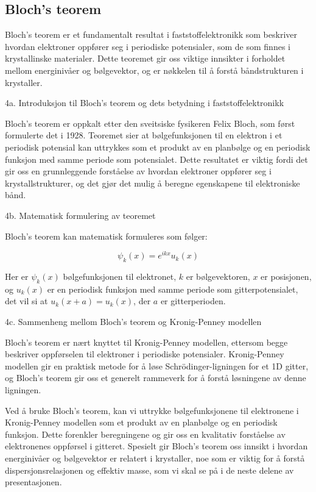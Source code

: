 \subsection*{Bloch's teorem}

Bloch's teorem er et fundamentalt resultat i faststoffelektronikk som beskriver hvordan elektroner oppfører seg i periodiske potensialer, som de som finnes i krystallinske materialer. Dette teoremet gir oss viktige innsikter i forholdet mellom energinivåer og bølgevektor, og er nøkkelen til å forstå båndstrukturen i krystaller.

4a. Introduksjon til Bloch's teorem og dets betydning i faststoffelektronikk

Bloch's teorem er oppkalt etter den sveitsiske fysikeren Felix Bloch, som først formulerte det i 1928. Teoremet sier at bølgefunksjonen til en elektron i et periodisk potensial kan uttrykkes som et produkt av en planbølge og en periodisk funksjon med samme periode som potensialet. Dette resultatet er viktig fordi det gir oss en grunnleggende forståelse av hvordan elektroner oppfører seg i krystallstrukturer, og det gjør det mulig å beregne egenskapene til elektroniske bånd.

4b. Matematisk formulering av teoremet

Bloch's teorem kan matematisk formuleres som følger:

\begin{equation*}
\psi_k(x) = e^{ikx}u_k(x)
\end{equation*}

Her er $\psi_k(x)$ bølgefunksjonen til elektronet, $k$ er bølgevektoren, $x$ er posisjonen, og $u_k(x)$ er en periodisk funksjon med samme periode som gitterpotensialet, det vil si at $u_k(x+a) = u_k(x)$, der $a$ er gitterperioden.

4c. Sammenheng mellom Bloch's teorem og Kronig-Penney modellen

Bloch's teorem er nært knyttet til Kronig-Penney modellen, ettersom begge beskriver oppførselen til elektroner i periodiske potensialer. Kronig-Penney modellen gir en praktisk metode for å løse Schrödinger-ligningen for et 1D gitter, og Bloch's teorem gir oss et generelt rammeverk for å forstå løsningene av denne ligningen.

Ved å bruke Bloch's teorem, kan vi uttrykke bølgefunksjonene til elektronene i Kronig-Penney modellen som et produkt av en planbølge og en periodisk funksjon. Dette forenkler beregningene og gir oss en kvalitativ forståelse av elektronenes oppførsel i gitteret. Spesielt gir Bloch's teorem oss innsikt i hvordan energinivåer og bølgevektor er relatert i krystaller, noe som er viktig for å forstå dispersjonsrelasjonen og effektiv masse, som vi skal se på i de neste delene av presentasjonen.

